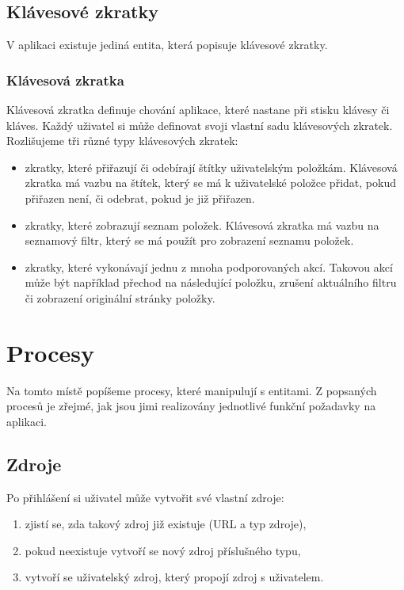 \subsection{Klávesové zkratky}

V aplikaci existuje jediná entita, která popisuje klávesové zkratky.

\subsubsection{Klávesová zkratka}

Klávesová zkratka definuje chování aplikace, které nastane při stisku klávesy či kláves.
Každý uživatel si může definovat svoji vlastní sadu klávesových zkratek.
Rozlišujeme tři různé typy klávesových zkratek:
\begin{itemize}
	\item zkratky, které přiřazují či odebírají štítky uživatelským položkám.
		Klávesová zkratka má vazbu na štítek, který se má k uživatelské položce přidat, pokud přiřazen není, či odebrat, pokud je již přiřazen.
	\item zkratky, které zobrazují seznam položek.
		Klávesová zkratka má vazbu na seznamový filtr, který se má použít pro zobrazení seznamu položek.
	\item zkratky, které vykonávají jednu z mnoha podporovaných akcí.
		Takovou akcí může být například přechod na následující položku, zrušení aktuálního filtru či zobrazení originální stránky položky.
\end{itemize}

\section{Procesy}

Na tomto místě popíšeme procesy, které manipulují s entitami.
Z popsaných procesů je zřejmé, jak jsou jimi realizovány jednotlivé funkční požadavky na aplikaci.

\subsection{Zdroje}

Po přihlášení si uživatel může vytvořit své vlastní zdroje:
\begin{enumerate}
	\item zjistí se, zda takový zdroj již existuje (URL a typ zdroje),
	\item pokud neexistuje vytvoří se nový zdroj příslušného typu,
	\item vytvoří se uživatelský zdroj, který propojí zdroj s uživatelem.
\end{enumerate}

